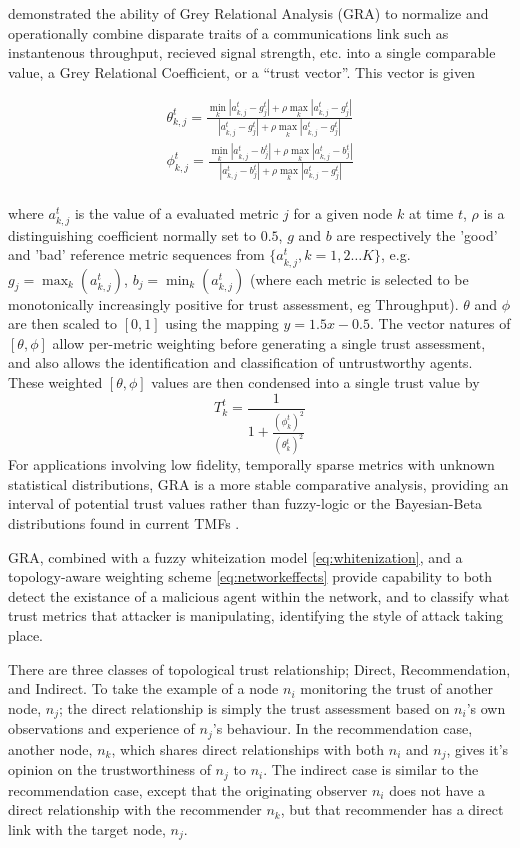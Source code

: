 \documentclass[runningheads,a4paper]{llncs}
\begin{document}
\cite{Guo2012} demonstrated the ability of Grey Relational Analysis (GRA) to normalize and operationally combine disparate traits of a communications link such as instantenous throughput, recieved signal strength, etc. into a single comparable value, a Grey Relational Coefficient, or a ``trust vector''.
This vector is given

\begin{align}
  \label{eq:grc}
  \theta_{k,j}^t = \frac{\min_k|a_{k,j}^t - g_j^t| + \rho \max_k|a_{k,j}^t-g_j^t|}{|a_{k,j}^t-g_j^t| + \rho \max_k|a_{k,j}^t-g_j^t|} \\
  \phi_{k,j}^t = \frac{\min_k|a_{k,j}^t - b_j^t| + \rho \max_k|a_{k,j}^t-b_j^t|}{|a_{k,j}^t-b_j^t| + \rho \max_k|a_{k,j}^t-g_j^t|}\\
\end{align}

where $a_{k,j}^t$ is the value of a evaluated metric $j$ for a given node $k$ at time $t$, $\rho$ is a distinguishing coefficient normally set to $0.5$, $g$ and $b$ are respectively the 'good' and 'bad' reference metric sequences from $\{a_{k,j}^t, k=1,2\dots K\}$, e.g. $g_j=\max_k({a_{k,j}^t})$,  $b_j=\min_k({a_{k,j}^t})$ (where each metric is selected to be monotonically increasingly positive for trust assessment, eg Throughput). $\theta$ and $\phi$ are then scaled to $[0,1]$ using the mapping $y = 1.5 x - 0.5$.
The vector natures of $[\theta,\phi]$ allow per-metric weighting before generating a single trust assessment, and also allows the identification and classification of untrustworthy agents.
These weighted $[\theta,\phi]$ values are then condensed into a single trust value by
\begin{equation}
  \label{eq:trustvalue}
  T_k^t = \frac{1}{1+\frac{(\phi_k^t)^2}{(\theta_k^t)^2}}
\end{equation}
For applications involving low fidelity, temporally sparse metrics with unknown statistical distributions, GRA is a more stable comparative analysis, providing an interval of potential trust values rather than fuzzy-logic or the Bayesian-Beta distributions found in current TMFs \cite{Liu2006}. 

GRA, combined with a fuzzy whiteization model \eqref{eq:whitenization}, and a topology-aware weighting scheme \eqref{eq:networkeffects} provide capability to both detect the existance of a malicious agent within the network, and to classify what trust metrics that attacker is manipulating, identifying the style of attack taking place.

There are three classes of topological trust relationship; Direct, Recommendation, and Indirect.
To take the example of a node $n_i$ monitoring the trust of another node, $n_j$; the direct relationship is simply the trust assessment based on $n_i$'s own observations and experience of $n_j$'s behaviour.
In the recommendation case, another node, $n_k$, which shares direct relationships with both $n_i$ and $n_j$, gives it's opinion on the trustworthiness of $n_j$ to $n_i$.
The indirect case is similar to the recommendation case, except that the originating observer $n_i$ does not have a direct relationship with the recommender $n_k$, but that recommender has a direct link with the target node, $n_j$.
\end{document}
